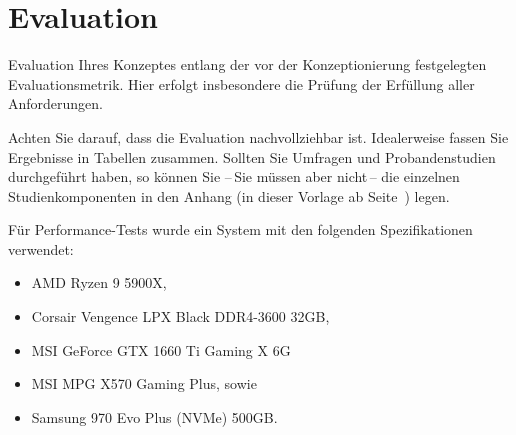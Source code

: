 \chapter{Evaluation}\label{chap:Evaluation}
Evaluation Ihres Konzeptes entlang der vor der Konzeptionierung festgelegten Evaluationsmetrik. Hier erfolgt insbesondere die Prüfung der Erfüllung aller Anforderungen.

Achten Sie darauf, dass die Evaluation nachvollziehbar ist. Idealerweise fassen Sie Ergebnisse in Tabellen zusammen. Sollten Sie Umfragen und Probandenstudien durchgeführt haben, so können Sie --\,Sie müssen aber nicht\,-- die einzelnen Studienkomponenten in den Anhang (in dieser Vorlage ab Seite~\pageref{apdx:A}) legen.


\noindent Für Performance-Tests wurde ein System mit den folgenden Spezifikationen verwendet:
\begin{itemize}
    \item AMD Ryzen 9 5900X,
    \item Corsair Vengence LPX Black DDR4-3600 32GB,
    \item MSI GeForce GTX 1660 Ti Gaming X 6G
    \item MSI MPG X570 Gaming Plus, sowie
    \item Samsung 970 Evo Plus (NVMe) 500GB.
\end{itemize}